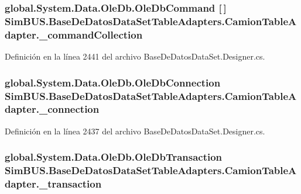 \subsubsection[{\-\_\-command\-Collection}]{\setlength{\rightskip}{0pt plus 5cm}global.\-System.\-Data.\-Ole\-Db.\-Ole\-Db\-Command [$\,$] Sim\-B\-U\-S.\-Base\-De\-Datos\-Data\-Set\-Table\-Adapters.\-Camion\-Table\-Adapter.\-\_\-command\-Collection\hspace{0.3cm}{\ttfamily [private]}}\label{class_sim_b_u_s_1_1_base_de_datos_data_set_table_adapters_1_1_camion_table_adapter_ad6454189262e1a64e236b6f6cb78a918}


Definición en la línea 2441 del archivo Base\-De\-Datos\-Data\-Set.\-Designer.\-cs.

\subsubsection[{\-\_\-connection}]{\setlength{\rightskip}{0pt plus 5cm}global.\-System.\-Data.\-Ole\-Db.\-Ole\-Db\-Connection Sim\-B\-U\-S.\-Base\-De\-Datos\-Data\-Set\-Table\-Adapters.\-Camion\-Table\-Adapter.\-\_\-connection\hspace{0.3cm}{\ttfamily [private]}}\label{class_sim_b_u_s_1_1_base_de_datos_data_set_table_adapters_1_1_camion_table_adapter_a583ee8cde2f522e22ce12dfea84ef4aa}


Definición en la línea 2437 del archivo Base\-De\-Datos\-Data\-Set.\-Designer.\-cs.

\subsubsection[{\-\_\-transaction}]{\setlength{\rightskip}{0pt plus 5cm}global.\-System.\-Data.\-Ole\-Db.\-Ole\-Db\-Transaction Sim\-B\-U\-S.\-Base\-De\-Datos\-Data\-Set\-Table\-Adapters.\-Camion\-Table\-Adapter.\-\_\-transaction\hspace{0.3cm}{\ttfamily [private]}}\label{class_sim_b_u_s_1_1_base_de_datos_data_set_table_adapters_1_1_camion_table_adapter_a3ca33fdad5dcdcea09fcea5a1b84da0f}


